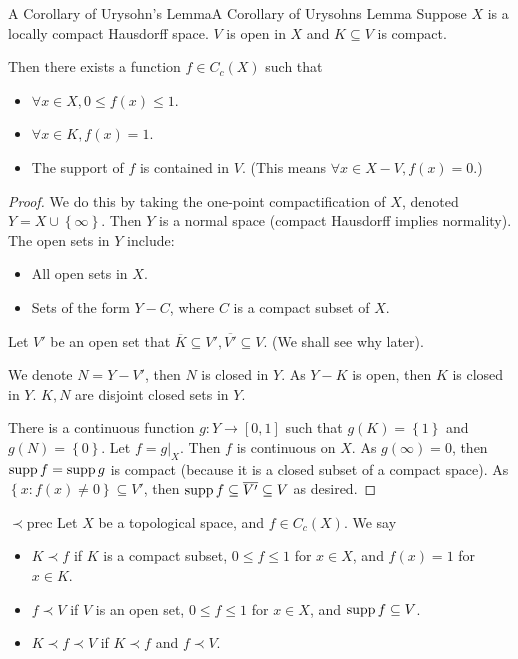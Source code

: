 \documentclass[../main.tex]{subfiles}
\begin{document}
\begin{theorem}{A Corollary of Urysohn's Lemma}{A Corollary of Urysohns Lemma}
	Suppose $X$ is a locally compact Hausdorff space. $V$ is open in $X$ and $K \subseteq V$ is compact.

	Then there exists a function $f\in C_c(X)$ such that
	\begin{itemize}
	\item $\forall x\in X,0\leq f(x)\leq 1$.
	\item $\forall x\in K, f(x) = 1$.
	\item The support of $f$ is contained in $V$. (This means $\forall x\in X-V,f(x)=0$.)
	\end{itemize}
\end{theorem}
\begin{proof}
	We do this by taking the one-point compactification of $X$, denoted $Y = X \cup \left\{ \infty  \right\}$. Then $Y$ is a normal space (compact Hausdorff implies normality). The open sets in $Y$ include:
	\begin{itemize}
	\item All open sets in $X$.
	\item Sets of the form $Y-C$, where $C$ is a compact subset of $X$.
	\end{itemize}
	Let $V'$ be an open set that $\overline{K} \subseteq V', \overline{V'}\subseteq V$. (We shall see why later).

	We denote $N = Y - V'$, then $N$ is closed in $Y$. As $Y-K$ is open, then $K$ is closed in $Y$. $K,N$ are disjoint closed sets in $Y$. 

	There is a continuous function $g: Y \rightarrow [0,1]$ such that $g(K) = \left\{ 1 \right\}$ and $g(N) = \left\{ 0 \right\}$. Let $f = g|_X$. Then $f$ is continuous on $X$. As $g(\infty )=0$, then $\operatorname{supp} f = \operatorname{supp} g$ is compact (because it is a closed subset of a compact space). As $\left\{ x:f(x)\neq 0 \right\} \subseteq V'$, then $\operatorname{supp} f \subseteq \overline{V'}\subseteq V$ as desired.
\end{proof}

\begin{notation}{$\prec$}{prec}
Let $X$ be a topological space, and $f\in C_c(X)$. We say
\begin{itemize}
\item $K\prec f$ if $K$ is a compact subset, $0\leq f\leq 1$ for $x\in X$, and $f(x) = 1$ for $x\in K$.
\item $f \prec V$ if $V$ is an open set, $0\leq f\leq 1$ for $x\in X$, and $\operatorname{supp} f \subseteq V$.
\item $K\prec f\prec V$ if $K\prec f$ and $f\prec V$.
\end{itemize}
\end{notation}
\end{document}
